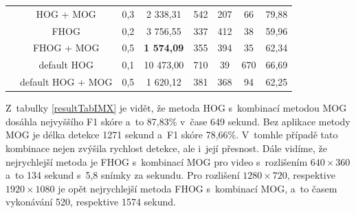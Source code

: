 \begin{table}[H]
\begin{tabular}{|c|c|c|c|c|c|c|c|}
      & HOG + MOG                  &    0,3 & 2 338,31  & 542 &    207 &     66 &      79,88      \\ \cline{2-8}  
      & FHOG                       &    0,2 & 3 756,55  & 337 &    412 &     38 &      59,96      \\ \cline{2-8}  
      & FHOG + MOG                 &    0,5 & \textbf{1 574,09}  & 355 &    394 &     35 &      62,34      \\ \cline{2-8}
      &  default HOG               &    0,1 & 10 473,00 & 710 &    39 &      670 &     66,69      \\ \cline{2-8}  
      &  default HOG + MOG         &    0,5 & 1 620,12  & 381 &    368 &     94 &      62,25      \\ \hline
\end{tabular}
\end{table}
Z~tabulky \ref{resultTabIMX} je vidět, že metoda HOG s~kombinací metodou MOG dosáhla nejvyššího F1 skóre a~to 87,83\% v~čase 649 sekund. Bez aplikace metody MOG je délka detekce 1271 sekund a~F1 skóre 78,66\%. V~tomhle případě tato kombinace nejen zvýšila rychlost detekce, ale i~její přesnost. Dále vidíme, že nejrychlejší metoda je FHOG s~kombinací MOG pro video s~rozlišením $640\times 360$ a~to 134 sekund s~5,8 snímky za sekundu. Pro rozlišení $1280\times720$, respektive $1920\times1080$ je opět nejrychlejší metoda FHOG s~kombinací MOG, a~to časem vykonávání 520, respektive 1574 sekund.

